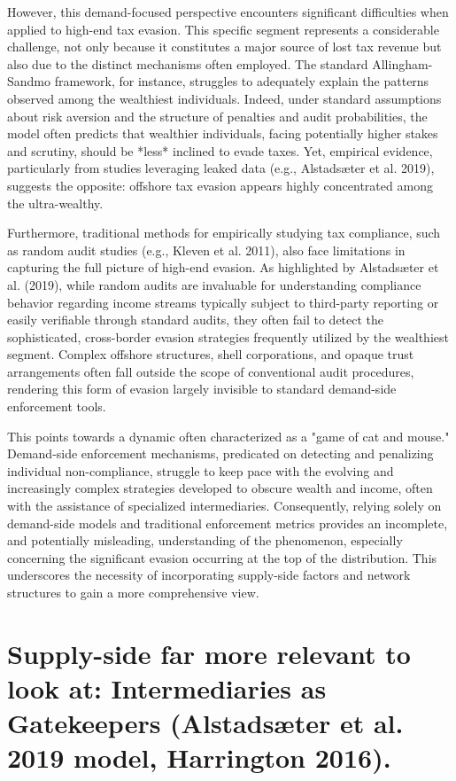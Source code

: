 However, this demand-focused perspective encounters significant difficulties when applied to high-end tax evasion. This specific segment represents a considerable challenge, not only because it constitutes a major source of lost tax revenue but also due to the distinct mechanisms often employed. The standard Allingham-Sandmo framework, for instance, struggles to adequately explain the patterns observed among the wealthiest individuals. Indeed, under standard assumptions about risk aversion and the structure of penalties and audit probabilities, the model often predicts that wealthier individuals, facing potentially higher stakes and scrutiny, should be *less* inclined to evade taxes. Yet, empirical evidence, particularly from studies leveraging leaked data (e.g., Alstadsæter et al. 2019), suggests the opposite: offshore tax evasion appears highly concentrated among the ultra-wealthy.

Furthermore, traditional methods for empirically studying tax compliance, such as random audit studies (e.g., Kleven et al. 2011), also face limitations in capturing the full picture of high-end evasion. As highlighted by Alstadsæter et al. (2019), while random audits are invaluable for understanding compliance behavior regarding income streams typically subject to third-party reporting or easily verifiable through standard audits, they often fail to detect the sophisticated, cross-border evasion strategies frequently utilized by the wealthiest segment. Complex offshore structures, shell corporations, and opaque trust arrangements often fall outside the scope of conventional audit procedures, rendering this form of evasion largely invisible to standard demand-side enforcement tools.

This points towards a dynamic often characterized as a "game of cat and mouse." Demand-side enforcement mechanisms, predicated on detecting and penalizing individual non-compliance, struggle to keep pace with the evolving and increasingly complex strategies developed to obscure wealth and income, often with the assistance of specialized intermediaries. Consequently, relying solely on demand-side models and traditional enforcement metrics provides an incomplete, and potentially misleading, understanding of the phenomenon, especially concerning the significant evasion occurring at the top of the distribution. This underscores the necessity of incorporating supply-side factors and network structures to gain a more comprehensive view.


\section{Supply-side far more relevant to look at: Intermediaries as Gatekeepers (Alstadsæter et al. 2019 model, Harrington 2016).}
\label{sec:1_3}

